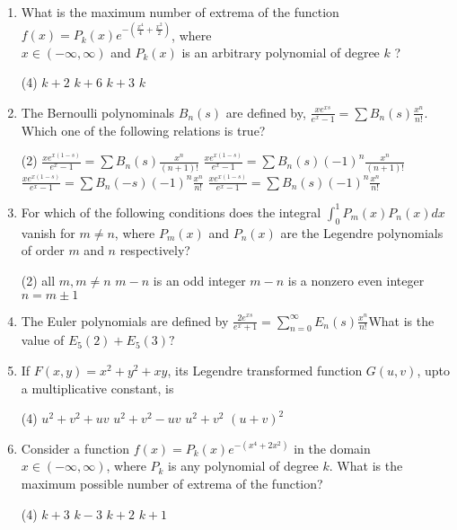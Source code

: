 \begin{enumerate}[label=\color{ocre}\textbf{\arabic*.}]
	\item What is the maximum number of extrema of the function $f(x)=P_{k}(x) e^{-\left(\frac{x^{4}}{4}+\frac{x^{2}}{2}\right)}$, where\\
	$x \in(-\infty, \infty)$ and $P_{k}(x)$ is an arbitrary polynomial of degree $k$ ?
{	}

\begin{tasks}(4)
\task[\textbf{A.}]  $k+2$
\task[\textbf{B.}]$k+6$
\task[\textbf{C.}] $k+3$
\task[\textbf{D.}]$k$
\end{tasks}
\item The Bernoulli polynominals $B_{n}(s)$ are defined by, $\frac{x e^{x s}}{e^{x}-1}=\sum B_{n}(s) \frac{x^{n}}{n !} .$ Which one of the following relations is true?
{}

\begin{tasks}(2)
\task[\textbf{A.}] $\frac{x e^{x(1-s)}}{e^{x}-1}=\sum B_{n}(s) \frac{x^{n}}{(n+1) !}$
\task[\textbf{B.}]$\frac{x e^{x(1-s)}}{e^{x}-1}=\sum B_{n}(s)(-1)^{n} \frac{x^{n}}{(n+1) !}$
\task[\textbf{C.}]$\frac{x e^{x(1-s)}}{e^{x}-1}=\sum B_{n}(-s)(-1)^{n} \frac{x^{n}}{n !}$
\task[\textbf{D.}]$\frac{x e^{x(1-s)}}{e^{x}-1}=\sum B_{n}(s)(-1)^{n} \frac{x^{n}}{n !}$
\end{tasks}
\item For which of the following conditions does the integral $\int_{0}^{1} P_{m}(x) P_{n}(x) d x$ vanish for $m \neq n$, where $P_{m}(x)$ and $P_{n}(x)$ are the Legendre polynomials of order $m$ and $n$ respectively?
{}

\begin{tasks}(2)
\task[\textbf{A.}] all $m, m \neq n$
\task[\textbf{B.}]$m-n$ is an odd integer
\task[\textbf{C.}]$m-n$ is a nonzero even integer
\task[\textbf{D.}]$n=m \pm 1$
\end{tasks}
\item The Euler polynomials are defined by $\frac{2 e^{x s}}{e^{x}+1}=\sum_{n=0}^{\infty} E_{n}(s) \frac{x^{n}}{n !}$What is the value of $E_{5}(2)+E_{5}(3) ?$
{}
\item If $F(x, y)=x^{2}+y^{2}+x y$, its Legendre transformed function $G(u, v)$, upto a multiplicative constant, is
{}

\begin{tasks}(4)
\task[\textbf{A.}] $u^{2}+v^{2}+u v$
\task[\textbf{B.}] $u^{2}+v^{2}-u v$
\task[\textbf{C.}]$u^{2}+v^{2}$
\task[\textbf{D.}]$(u+v)^{2}$
\end{tasks}
\item  Consider a function $f(x)=P_{k}(x) e^{-\left(x^{4}+2 x^{2}\right)}$ in the domain $x \in(-\infty, \infty)$, where $P_{k}$ is any polynomial of degree $k$. What is the maximum possible number of extrema of the function?
{}

\begin{tasks}(4)
\task[\textbf{A.}] $k+3$
\task[\textbf{B.}] $k-3$
\task[\textbf{C.}]$k+2$
\task[\textbf{D.}]$k+1$
\end{tasks}
\end{enumerate}
